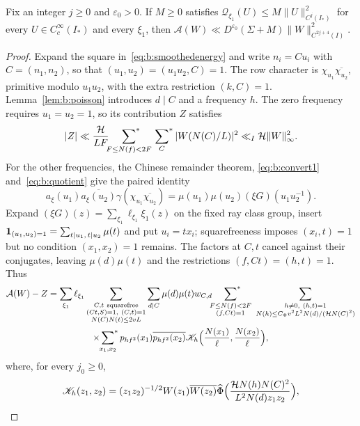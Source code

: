 \begin{lemma}\label{lem:b:firsttransfer}
Fix an integer $j\ge0$ and $\varepsilon_0>0$. If $M\ge0$ satisfies $\mathcal Q_{\xi_1}(U)\le M\|U\|^2_{C^j(I_*)}$ for every $U\in C_c^\infty(I_*)$ and every $\xi_1$, then $\mathcal A(W)\ll D^{\varepsilon_0}(\Sigma+M)\|W\|^2_{C^{2j+4}(I)}$.
\end{lemma}

\begin{proof}
Expand the square in~\eqref{eq:b:smoothedenergy} and write $n_i=Cu_i$ with $C=(n_1,n_2)$, so that $(u_1,u_2)=(u_1u_2,C)=1$. The row character is $\chi_{u_1}\overline{\chi_{u_2}}$, primitive modulo $u_1u_2$, with the extra restriction $(k,C)=1$. Lemma~\ref{lem:b:poisson} introduces $d\mid C$ and a frequency $h$. The zero frequency requires $u_1=u_2=1$, so its contribution $Z$ satisfies
\[
  |Z|\ll\frac{\mathcal H}{LF}\sideset{}{^*}\sum_{F\le N(f)<2F}\sideset{}{^*}\sum_C|W(N(C)/L)|^2\ll_I\mathcal H\|W\|_\infty^2.
\]
For the other frequencies, the Chinese remainder theorem, \eqref{eq:b:convert1} and~\eqref{eq:b:quotient} give the paired identity
\begin{equation}\label{eq:b:pairedfirstgauss}
  a_\xi(u_1)\overline{a_\xi(u_2)}\gamma(\chi_{u_1}\overline{\chi_{u_2}})=\mu(u_1)\mu(u_2)(\xi G)(u_1u_2^{-1}).
\end{equation}
Expand $(\xi G)(z)=\sum_{\xi_1}\ell_{\xi_1}\xi_1(z)$ on the fixed ray class group, insert $\mathbf{1}_{(u_1,u_2)=1}=\sum_{t\mid u_1,\,t\mid u_2}\mu(t)$ and put $u_i=tx_i$; squarefreeness imposes $(x_i,t)=1$ but no condition $(x_1,x_2)=1$ remains. The factors at $C,t$ cancel against their conjugates, leaving $\mu(d)\mu(t)$ and the restrictions $(f,Ct)=(h,t)=1$. Thus
\begin{multline*}
  \mathcal A(W)-Z=\sum_{\xi_1}\ell_{\xi_1}\sum_{\substack{C,t\ {\rm squarefree}\\(Ct,S)=1,\ (C,t)=1\\N(C)N(t)\le2vL}}\sum_{d\mid C}\mu(d)\mu(t)w_{C,d}\sfstar_{\substack{F\le N(f)<2F\\(f,Ct)=1}}\ \sum_{\substack{h\ne0,\ (h,t)=1\\N(h)\le C_\Phi v^2L^2N(d)/(\mathcal HN(C)^2)}}\\
  \times\sfstar_{x_1,x_2}p_{hf^2}(x_1)\overline{p_{hf^2}(x_2)}\mathscr K_h\Bigl(\frac{N(x_1)}\ell,\frac{N(x_2)}\ell\Bigr),
\end{multline*}
where, for every $j_0\ge0$,
\[
  \begin{gathered}
  \mathscr K_h(z_1,z_2)=(z_1z_2)^{-1/2}W(z_1)\overline{W(z_2)}\widehat\Phi\Bigl(\frac{\mathcal HN(h)N(C)^2}{L^2N(d)z_1z_2}\Bigr),\\

\end{gathered}\]
\end{proof}
